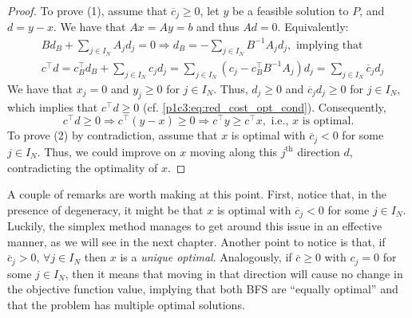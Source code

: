 \begin{proof}
To prove (1), assume that $\overline{c}_j \geq 0$, let $y$ be a feasible solution to $P$, and $d = y - x$. We have that $Ax = Ay = b$ and thus $Ad = 0$. Equivalently:
%
\begin{align}
	&B d_B + \sum_{j \in I_N}A_j d_j = 0 \Rightarrow d_B = - \sum_{j \in I_N}B^{-1}A_jd_j, \text{ implying that } \nonumber \\
	&c^\top d = c_B^\top d_B + \sum_{j \in I_N}c_jd_j= \sum_{j \in I_N} (c_j - c_B^\top B^{-1}A_j)d_j = \sum_{j \in I_N}\overline{c}_jd_j \label{p1c3:eq:red_cost_opt_cond}
\end{align}
%
We have that $x_j = 0$ and $y_j \geq 0$	for $j \in I_N$. Thus, $d_j \geq 0$ and $\overline{c}_jd_j \geq 0$ for $j \in I_N$, which implies that $c^\top d \geq 0$ (cf. \eqref{p1c3:eq:red_cost_opt_cond}). Consequently,
%
\begin{equation*}
	c^\top d \geq 0 \Rightarrow	c^\top (y - x) \geq 0 \Rightarrow c^\top y \geq c^\top x, \text{ i.e., $x$ is optimal.}
\end{equation*}
%
To prove (2) by contradiction, assume that $x$ is optimal with $\overline{c}_j < 0$ for some $j \in I_N$. Thus, we could improve on $x$ moving along this $j^\text{th}$ direction $d$, contradicting the optimality of $x$.
\end{proof}

A couple of remarks are worth making at this point. First, notice that, in the presence of degeneracy, it might be that $x$ is optimal with $\overline{c}_j < 0$ for some $j \in I_N$. Luckily, the simplex method manages to get around this issue in an effective manner, as we will see in the next chapter. Another point to notice is that, if $\overline{c}_j > 0$, $\forall j \in I_N$ then $x$ is a \emph{unique optimal}. Analogously, if $\overline{c} \geq 0$ with $c_j =0$ for some $j \in I_N$, then it means that moving in that direction will cause no change in the objective function value, implying that both BFS are ``equally optimal'' and that the problem has multiple optimal solutions. 





